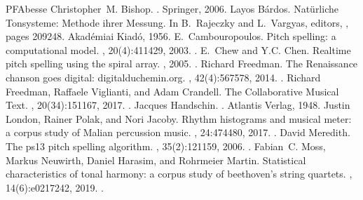 \documentclass[letterpaper,10pt,english]{sphinxmanual}
\begin{document}
\begin{sphinxthebibliography}{PFAbesse}
Christopher M. Bishop. . Springer, 2006.
Layos Bárdos. Natürliche Tonsysteme: Methode ihrer Messung. In B. Rajeczky and L. Vargyas, editors, , pages 209\textendash{}\textendash{}248. Akadémiai Kiadó, 1956.
E. Cambouropoulos. Pitch spelling: a computational model. , 20(4):411\textendash{}429, 2003. .
E. Chew and Y.\sphinxhyphen{}C. Chen. Real\sphinxhyphen{}time pitch spelling using the spiral array. , 2005. .
Richard Freedman. The Renaissance chanson goes digital: digitalduchemin.org. , 42(4):567\textendash{}578, 2014. .
Richard Freedman, Raffaele Viglianti, and Adam Crandell. The Collaborative Musical Text. , 20(3\textendash{}4):151\textendash{}167, 2017. .
Jacques Handschin. . Atlantis Verlag, 1948.
Justin London, Rainer Polak, and Nori Jacoby. Rhythm histograms and musical meter: a corpus study of Malian percussion music. , 24:474\textendash{}480, 2017. .
David Meredith. The ps13 pitch spelling algorithm. , 35(2):121\textendash{}159, 2006. .
Fabian C. Moss, Markus Neuwirth, Daniel Harasim, and Rohrmeier Martin. Statistical characteristics of tonal harmony: a corpus study of beethoven’s string quartets. , 14(6):e0217242, 2019. .

\end{sphinxthebibliography}
\end{document}
